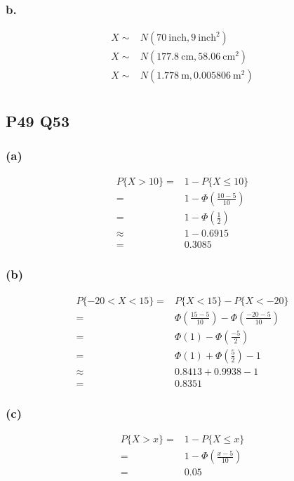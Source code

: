 \documentclass[a4paper,12pt]{ctexart}
\begin{document}
\subsubsection*{b.}

\begin{align*}
	X \sim& N(70\ \text{inch}, 9\ \text{inch}^2)\\
	X \sim& N(177.8\ \text{cm}, 58.06\ \text{cm}^2)\\
	X \sim& N(1.778\ \text{m}, 0.005806\ \text{m}^2)\\
\end{align*}

\subsection*{P49 Q53}

\subsubsection*{(a)}

\begin{align*}
	P\{X > 10\} =& 1 - P\{X \leq 10\}\\
	=& 1 - \Phi\left(\frac{10 - 5}{10}\right)\\
	=& 1 - \Phi\left(\frac{1}{2}\right)\\
	\approx& 1 - 0.6915\\
	=& 0.3085
\end{align*}

\subsubsection*{(b)}

\begin{align*}
	P\{-20 < X < 15\} =& P\{X < 15\} - P\{X < -20\}\\
	=& \Phi\left(\frac{15 - 5}{10}\right) - \Phi\left(\frac{-20 - 5}{10}\right)\\
	=& \Phi(1) - \Phi\left(\frac{-5}{2}\right)\\
	=& \Phi(1) + \Phi\left(\frac{5}{2}\right) - 1\\
	\approx& 0.8413 + 0.9938 - 1\\
	=& 0.8351
\end{align*}

\subsubsection*{(c)}
\begin{align*}
	P\{X > x\} =& 1 - P\{X \leq x\}\\
	=& 1 - \Phi\left(\frac{x - 5}{10}\right)\\
	=& 0.05
\end{align*}
\end{document}

